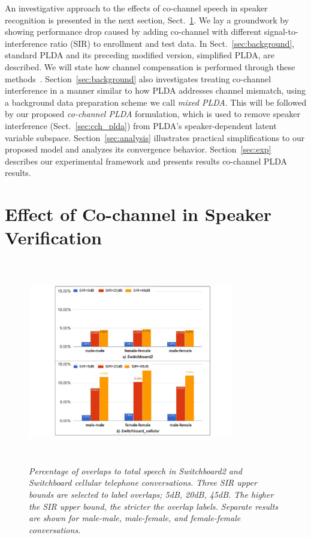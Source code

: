 \documentclass[journal]{IEEEtran}
\begin{document}
An investigative approach to the effects of co-channel speech in speaker recognition is presented in the next section, Sect.~\ref{sec:cochannl_in_sid}. We lay a groundwork by showing performance drop caused by adding co-channel with different signal-to-interference ratio (SIR) to enrollment and test data. 
In Sect.~\ref{sec:background}, standard PLDA and its preceding modified version, simplified PLDA, are described. We will state how channel compensation is performed through these methods~\cite{prince_plda,kenny_plda}. 
Section~\ref{sec:background} also investigates treating co-channel interference in a manner similar to how PLDA addresses channel mismatch, using a background data preparation scheme we call {\it mixed PLDA}. 
This will be followed by our proposed {\it co-channel PLDA} formulation, which is used to remove speaker interference (Sect.~\ref{sec:cch_plda}) from PLDA's speaker-dependent latent variable subspace. 
Section~\ref{sec:analysis} illustrates practical simplifications to our proposed model and analyzes its convergence behavior. 
Section~\ref{sec:exp} describes our experimental framework and presents results co-channel PLDA results. 

\section{Effect of Co-channel in Speaker Verification}
\label{sec:cochannl_in_sid}

\begin{figure}[t!]
	\centering
	\vspace{0mm}
	\includegraphics[height = 3.5in, width=0.8\textwidth]{figures/swb_overlap_percentage-crop}
	\vspace{-1mm}
	\caption{\it \small Percentage of overlaps to total speech in Switchboard2 and Switchboard cellular telephone conversations. Three SIR upper bounds are selected to label overlaps; 5dB, 20dB, 45dB. The higher the SIR upper bound, the stricter the overlap labels. Separate results are shown for male-male, male-female, and female-female conversations.}
	\label{fig:swb_overlap_percentage}
	\vspace{-3mm}
\end{figure}
\end{document}
